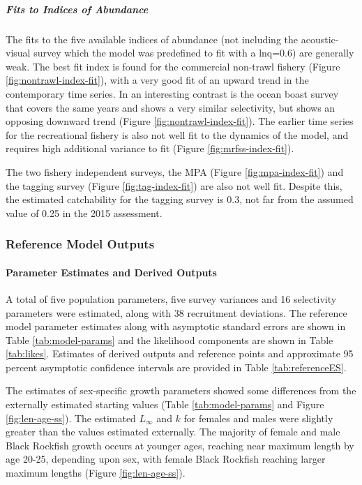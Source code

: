 \documentclass[11pt,
  english,
  letterpaper,
]{article}
\begin{document}
\hypertarget{fits-to-indices-of-abundance}{%
\subparagraph{Fits to Indices of Abundance}\label{fits-to-indices-of-abundance}}

The fits to the five available indices of abundance (not including the acoustic-visual survey which the model was predefined to fit with a lnq=0.6) are generally weak. The best fit index is found for the commercial non-trawl fishery (Figure \ref{fig:nontrawl-index-fit}), with a very good fit of an upward trend in the contemporary time series. In an interesting contrast is the ocean boast survey that covers the same years and shows a very similar selectivity, but shows an opposing downward trend (Figure \ref{fig:nontrawl-index-fit}). The earlier time series for the recreational fishery is also not well fit to the dynamics of the model, and requires high additional variance to fit (Figure \ref{fig:mrfss-index-fit}).

The two fishery independent surveys, the MPA (Figure \ref{fig:mpa-index-fit}) and the tagging survey (Figure \ref{fig:tag-index-fit}) are also not well fit. Despite this, the estimated catchability for the tagging survey is 0.3, not far from the assumed value of 0.25 in the 2015 assessment.

\hypertarget{reference-model-outputs}{%
\subsubsection{Reference Model Outputs}\label{reference-model-outputs}}

\hypertarget{parameter-estimates-and-derived-outputs}{%
\paragraph{Parameter Estimates and Derived Outputs}\label{parameter-estimates-and-derived-outputs}}

A total of five population parameters, five survey variances and 16 selectivity parameters were estimated, along with 38 recruitment deviations. The reference model parameter estimates along with asymptotic standard errors are shown in Table \ref{tab:model-params} and the likelihood components are shown in Table \ref{tab:likes}. Estimates of derived outputs and reference points and approximate 95 percent asymptotic confidence intervals are provided in Table \ref{tab:referenceES}.

The estimates of sex-specific growth parameters showed some differences from the externally estimated starting values (Table \ref{tab:model-params} and Figure \ref{fig:len-age-ss}). The estimated \(L_{\infty}\) and \(k\) for females and males were slightly greater than the values estimated externally. The majority of female and male Black Rockfish growth occurs at younger ages, reaching near maximum length by age 20-25, depending upon sex, with female Black Rockfish reaching larger maximum lengths (Figure \ref{fig:len-age-ss}).
\end{document}
